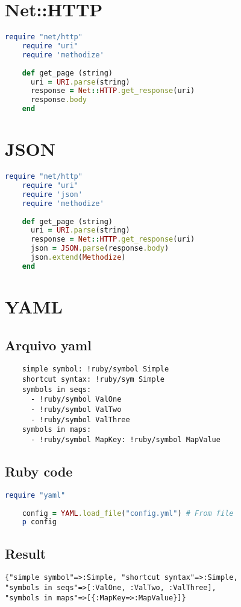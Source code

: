 \documentclass[serif,mathserif]{book}
\begin{document}
\section{Net::HTTP}

\begin{lstlisting}[language=ruby]
	require "net/http"
	require "uri"
	require 'methodize'
	
	def get_page (string)
	  uri = URI.parse(string)
	  response = Net::HTTP.get_response(uri)
	  response.body
	end
\end{lstlisting}

\section{JSON}

\begin{lstlisting}[language=ruby]
	require "net/http"
	require "uri"
	require 'json'
	require 'methodize'
	
	def get_page (string)
	  uri = URI.parse(string)
	  response = Net::HTTP.get_response(uri)
	  json = JSON.parse(response.body)
	  json.extend(Methodize)
	end
\end{lstlisting}

\section{YAML}

\subsection{Arquivo yaml}

\begin{verbatim}
	simple symbol: !ruby/symbol Simple 
	shortcut syntax: !ruby/sym Simple 
	symbols in seqs: 
	  - !ruby/symbol ValOne 
	  - !ruby/symbol ValTwo 
	  - !ruby/symbol ValThree 
	symbols in maps: 
	  - !ruby/symbol MapKey: !ruby/symbol MapValue 
\end{verbatim}

\subsection{Ruby code}

\begin{lstlisting}[language=ruby]
	require "yaml"
	
	config = YAML.load_file("config.yml") # From file
	p config
\end{lstlisting}

\subsection{Result}

\begin{verbatim}
{"simple symbol"=>:Simple, "shortcut syntax"=>:Simple, 
"symbols in seqs"=>[:ValOne, :ValTwo, :ValThree], 
"symbols in maps"=>[{:MapKey=>:MapValue}]}
\end{verbatim}




\end{document}
